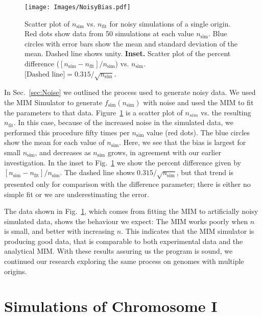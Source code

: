 		\begin{figure}[tbh]
			\begin{center}
				\texttt{[image: Images/NoisyBias.pdf]}
			\end{center}
				\caption[Bias in MIM Fit to Noisy Data]{\label{fig:NoisyBias} Scatter plot of $n_\text{sim}$ vs. $n_\text{fit}$ for noisy simulations of a single origin.
				Red dots show data from 50 simulations at each value $n_\text{sim}$.
				Blue circles with error bars show the mean and standard deviation of the mean.
				Dashed line shows unity.
				\textbf{Inset.} Scatter plot of the percent difference ($[n_\text{sim} - n_\text{fit}]/n_\text{sim}$) vs. $n_\text{sim}$.\\
				$\text{[Dashed line]} = 0.315/\sqrt{n_\text{sim}}$.
				}
		\end{figure}
		
		In Sec.~\ref{sec:Noise} we outlined the process used to generate noisy data.
		We used the MIM Simulator to generate $f_\text{sim}(n_\text{sim})$ with noise and used the MIM to fit the parameters to that data.
		Figure~\ref{fig:NoisyBias} is a scatter plot of $n_{sim}$ vs. the resulting $n_\text{fit}$.
		In this case, because of the increased noise in the simulated data, we performed this procedure fifty times per $n_\text{sim}$ value (red dots).
		The blue circles show the mean for each value of $n_\text{sim}$.
		Here, we see that the bias is largest for small $n_\text{sim}$, and decreases as $n_\text{sim}$ grows, in agreement with our earlier investigation.
		In the inset to Fig.~\ref{fig:NoisyBias} we show the percent difference given by $[n_\text{sim} - n_\text{fit}]/n_\text{sim}$.
		The dashed line shows $0.315/\sqrt{n_\text{sim}}$, but that trend is presented only for comparison with the difference parameter; there is either no simple fit or we are underestimating the error.
		
		The data shown in Fig.~\ref{fig:NoisyBias}, which comes from fitting the MIM to artificially noisy simulated data, shows the behaviour we expect:
		The MIM works poorly when $n$ is small, and better with increasing $n$.
		This indicates that the MIM simulator is producing good data, that is comparable to both experimental data and the analytical MIM.
		With these results assuring us the program is sound, we continued our research exploring the same process on genomes with multiple origins.
		
		
	\section{Simulations of Chromosome I}
	\label{sec:ChromosomeI}
	
